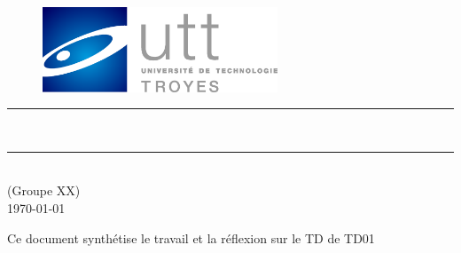 \thispagestyle{empty} 
\setcounter{page}{0}

\begin{figure}[H]
\centering
\includegraphics[width=7cm]{Ressources-graphiques/logos/UTT/logo_UTT.pdf}
\end{figure}

\vspace{3cm}

\begin{center}

{\color{bleuCielUTT}\rule{\linewidth}{0.8mm}}
\vspace*{0mm}

\Huge{\textbf{\theUE \\ \thetitle}}
{\color{bleuCielUTT}\rule{\linewidth}{0.8mm}}

\vspace{0.5cm}
\Large{\theauthor} \\
\small{(Groupe XX)}\\
\Large{\today}
\end{center}
 
\vspace{3cm}

\begin{myabstract}
Ce document synthétise le travail et la réflexion sur le TD de TD01
\end{myabstract}

\clearpage
